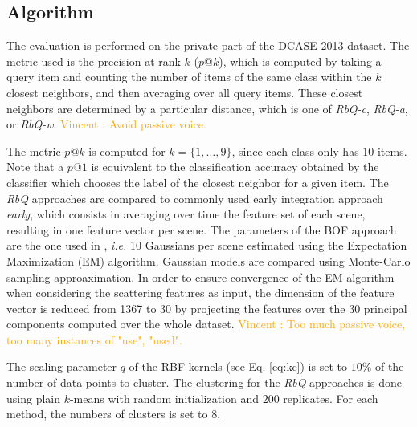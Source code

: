 \documentclass[smallextended]{svjour3}
\newcommand{\vl}[1]{\textcolor{orange}{Vincent : #1}}
\newcommand{\ja}[1]{\textcolor{magenta}{Joakim : #1}}
\newcommand{\ml}[1]{\textcolor{blue}{ Mathieu : #1}}
\begin{document}


\subsection{Algorithm}

The evaluation is performed on the private part of the DCASE 2013 dataset. The metric used is the precision at rank $k$ ($p@k$), which is computed by taking a query item and counting the number of items of the same class within the $k$ closest neighbors, and then averaging over all query items. These closest neighbors are determined by a particular distance, which is one of \emph{RbQ-c}, \emph{RbQ-a}, or \emph{RbQ-w}. \vl{Avoid passive voice.}

The metric $p@k$ is computed for $k=\lbrace 1,\ldots,9\rbrace$, since each class only has $10$ items. Note that a $p@1$ is equivalent to the classification accuracy obtained by the classifier which chooses the label of the closest neighbor for a given item. The \emph{RbQ} approaches are compared to commonly used early integration approach \emph{early}, which consists in averaging over time the feature set of each scene, resulting in one feature vector per scene. The parameters of the BOF approach are the one used in \cite{aucouturier2007bag}, \textit{i.e.} 10 Gaussians per scene estimated using the Expectation Maximization (EM) algorithm. Gaussian models are compared using Monte-Carlo sampling approaximation. In order to ensure convergence of the EM algorithm when considering the scattering features as input, the dimension of the feature vector is reduced from 1367 to 30 by projecting the features over the 30 principal components computed over the whole dataset. \vl{Too much passive voice, too many instances of "use", "used".}

The scaling parameter $q$ of the RBF kernels (see Eq. \ref{eq:kc}) is set to $10\%$ of the number of data points to cluster.%
The clustering for the \emph{RbQ} approaches is done using plain $k$-means with random initialization and $200$ replicates. For each method, the numbers of clusters is set to $8$.
\end{document}
